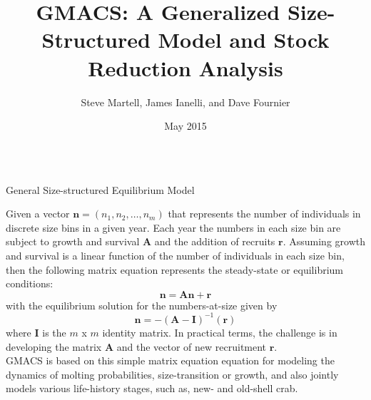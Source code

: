 \documentclass[final]{beamer} %
\title[\url{https://github.com/seacode/gmacs}]{GMACS: A Generalized Size-Structured Model and Stock Reduction Analysis}
\author[Martell et al.]{Steve Martell, James Ianelli, and Dave Fournier}
\institute[IPHC]{International Pacific Halibut Commission, Alaska Fisheries Science Center, and Otter Research}
\date[Photo Credit: S. Isachenko]{May 2015}
\begin{document}
  \begin{frame}{} 
    \begin{columns}[t]
      
      \begin{column}{.3\linewidth}
        \vspace{3in}
        
        \begin{block}{\large General Size-structured Equilibrium Model}


          Given a vector $\bm{n} = (n_1,n_2,\ldots,n_m)$ that represents the number of individuals in discrete
          size bins in a given year.  Each year the numbers in each size bin are subject to 
          growth and survival $\bm{A}$ and the addition of recruits $\bm{r}$.
          Assuming growth and survival is a linear function of the number of 
          individuals in each size bin, then the following matrix equation represents
          the steady-state or equilibrium conditions:
          \[\bm{n} = \bm{A}\bm{n} + \bm{r}\]
          with the equilibrium solution for the numbers-at-size given by
          \[\bm{n} = -(\bm{A} - \bm{I})^{-1} (\bm{r})\]
          where $\bm{I}$ is the $m$ x $m$ identity matrix. In practical terms, the 
          challenge is in developing the matrix $\bm{A}$ and the vector of new recruitment
          $\bm{r}$.\\[1ex]

          GMACS is based on this simple matrix equation equation for modeling the dynamics of molting probabilities, size-transition or growth, and also jointly models various life-history stages, such as, new- and old-shell crab.


\end{block}
\end{column}
\end{columns}
\end{frame}
\end{document}

